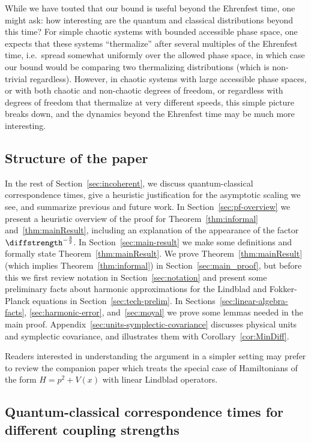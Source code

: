 \documentclass{article}
\numberwithin{equation}{section}
\begin{document}
While we have touted that our bound is useful beyond the Ehrenfest time, one might ask: how interesting are the quantum and classical distributions beyond this time?  For simple chaotic systems with bounded accessible phase space, one expects that these systems ``thermalize'' after several multiples of the Ehrenfest time, i.e.\ spread somewhat uniformly over the allowed phase space, in which case our bound would be comparing two thermalizing distributions (which is non-trivial regardless).  However, in chaotic systems with large accessible phase spaces, or with both chaotic and non-chaotic degrees of freedom, or regardless with degrees of freedom that thermalize at very different speeds, this simple picture breaks down, and the dynamics beyond the Ehrenfest time may be much  more interesting.



\subsection{Structure of the paper}
In the rest of Section~\ref{sec:incoherent}, we discuss quantum-classical correspondence times, give a heuristic justification for the asymptotic scaling we see, and summarize previous and future work.
In Section~\ref{sec:pf-overview} we present a 
heuristic overview of the proof for Theorem~\ref{thm:informal} and~\ref{thm:mainResult}, including an explanation of the appearance of the factor $\diffstrength^{-\frac{3}{2}}$. In Section~\ref{sec:main-result} we make some definitions and formally state Theorem~\ref{thm:mainResult}.  
We prove Theorem~\ref{thm:mainResult} (which implies Theorem~\ref{thm:informal}) in Section~\ref{sec:main_proof}, but before this
we first review notation in Section~\ref{sec:notation} and present some preliminary facts about harmonic approximations for the Lindblad and Fokker-Planck equations in Section~\ref{sec:tech-prelim}.
In Sections~\ref{sec:linear-algebra-facts}, \ref{sec:harmonic-error}, and~\ref{sec:moyal} we prove some lemmas
needed in the main proof.  Appendix~\ref{sec:units-symplectic-covariance} discusses physical units and symplectic covariance, and illustrates them with Corollary~\ref{cor:MinDiff}.

Readers interested in understanding the argument in a simpler setting may prefer to review the companion paper \cite{hernandez2023decoherence1} which treats the special case of Hamiltonians of the form $H=p^2+V(x)$ with linear Lindblad operators. 

\subsection{Quantum-classical correspondence times for different coupling strengths} \label{sec:corresponedence-time}
\end{document}
